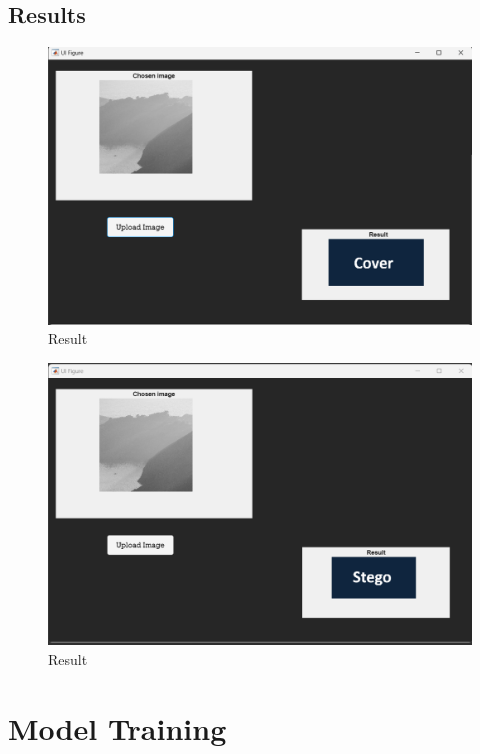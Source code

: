 \subsection{Results}
\begin{figure}[H]
    \centering
    \includegraphics[width=140mm]{./img/resultGrayCover.png}
    \caption{Result}
\end{figure}
\begin{figure}[H]
    \centering
    \includegraphics[width=140mm]{./img/resultGrayStego.png}
    \caption{Result}
\end{figure}


\section{Model Training}
